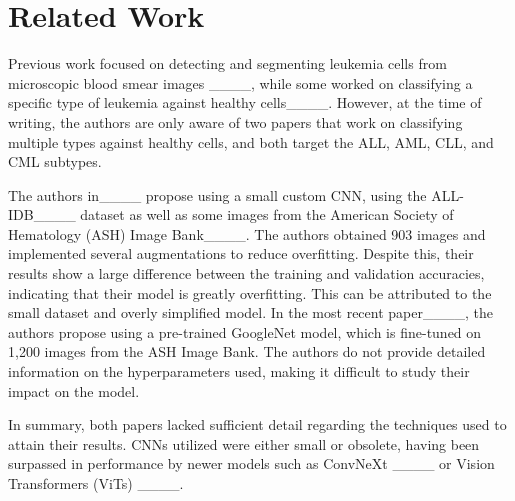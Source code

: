 \section{Related Work}
Previous work focused on detecting and segmenting leukemia cells from microscopic blood smear images ____, while some worked on classifying a specific type of leukemia against healthy cells____. However, at the time of writing, the authors are only aware of two papers that work on classifying multiple types against healthy cells, and both target the ALL, AML, CLL, and CML subtypes.

The authors in____ propose using a small custom CNN, using the ALL-IDB____ dataset as well as some images from the American Society of Hematology (ASH) Image Bank____. The authors obtained 903 images and implemented several augmentations to reduce overfitting. Despite this, their results show a large difference between the training and validation accuracies, indicating that their model is greatly overfitting. This can be attributed to the small dataset and overly simplified model. In the most recent paper____, the authors propose using a pre-trained GoogleNet model, which is fine-tuned on 1,200 images from the ASH Image Bank. The authors do not provide detailed information on the hyperparameters used, making it difficult to study their impact on the model.

In summary, both papers lacked sufficient detail regarding the techniques used to attain their results. %
CNNs utilized were either small or obsolete, having been surpassed in performance by newer models such as ConvNeXt ____ or Vision Transformers (ViTs) ____.

